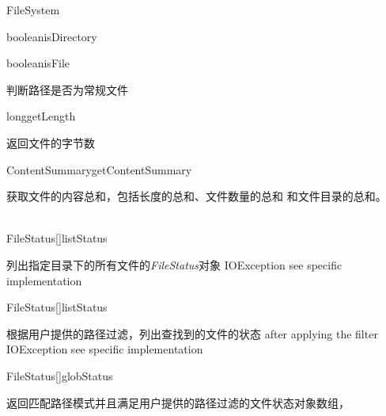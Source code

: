 \begin{XeClass}{FileSystem}
\begin{XeMethod}{\XePublic}{boolean}{isDirectory}
    \end{XeMethod}

    \begin{XeMethod}{\XePublic}{boolean}{isFile}
         
 判断路径是否为常规文件

    \end{XeMethod}

    \begin{XeMethod}{\XePublic}{long}{getLength}
         
 返回文件的字节数

    \end{XeMethod}

    \begin{XeMethod}{\XePublic}{ContentSummary}{getContentSummary}
         
 获取文件的内容总和，包括长度的总和、文件数量的总和
 和文件目录的总和。

    \end{XeMethod}

    \begin{XeMethod}{\XePublic \\ \XeAbstract}{FileStatus[]}{listStatus}
         
 列出指定目录下的所有文件的\emph{FileStatus}对象
 IOException see specific implementation

    \end{XeMethod}

    \begin{XeMethod}{\XePublic}{FileStatus[]}{listStatus}
         
 根据用户提供的路径过滤，列出查找到的文件的状态
 after applying the filter
 IOException see specific implementation

    \end{XeMethod}

    \begin{XeMethod}{\XePublic}{FileStatus[]}{globStatus}
         
 返回匹配路径模式并且满足用户提供的路径过滤的文件状态对象数组，

    \end{XeMethod}



\end{XeClass}
